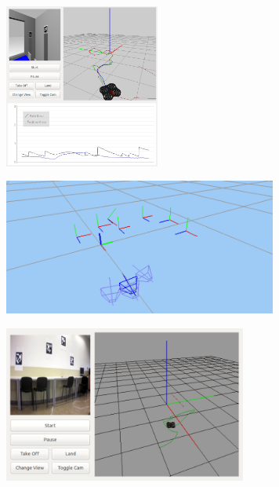 \documentclass[notes,slidesec,a4]{seminar}
\begin{document}
\begin{hslide}

\begin{center}
	\begin{figure}
		\centering
		\includegraphics[width=5.1cm]{img/fulltest3}
	\end{figure}
\end{center}

\end{hslide}


\begin{hslide}

\begin{center}
	\begin{figure}
		\centering
		\includegraphics[width=9cm]{img/loc4m}
	\end{figure}
\end{center}

\end{hslide}


\begin{hslide}

\begin{center}
	\begin{figure}
		\centering
		\includegraphics[width=8cm]{img/fullreal1}
	\end{figure}
\end{center}

\end{hslide}
\end{document}
